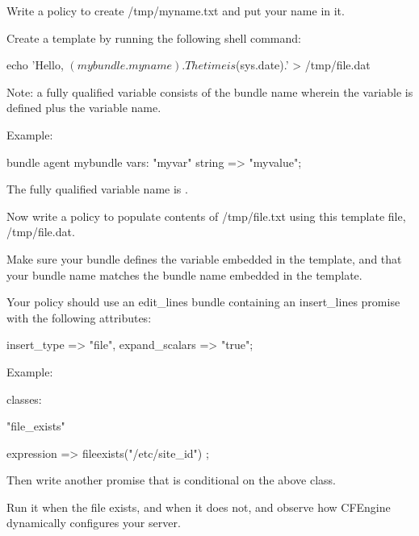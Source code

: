 \begin{aside}
\label{aside:exercise_51}

Write a policy to create /tmp/myname.txt and put your name in it.

\end{aside}





\begin{aside}
\label{aside:exercise_52}

Create a template by running the following shell command:

\begin{code}
echo 'Hello, $(mybundle.myname).  The time is $(sys.date).' > /tmp/file.dat
\end{code}

Note: a fully qualified variable consists of the bundle name wherein the variable is defined plus the variable name.

Example:

\begin{code}
bundle agent mybundle { vars: "myvar" string => "myvalue"; }
\end{code}

The fully qualified variable name is .

Now write a policy to populate contents of /tmp/file.txt using this template file, /tmp/file.dat.

Make sure your bundle defines the variable embedded in the template, and that your bundle name matches the bundle name embedded in the template.

Your policy should use an edit\_lines bundle containing an insert\_lines promise with the following attributes:

\begin{code}
insert_type => "file",
expand_scalars => "true";
\end{code}

\end{aside}





\begin{aside}
\label{aside:exercise_53}

Example:

\begin{code}
    classes:

       "file_exists"

           expression  =>  fileexists("/etc/site_id") ;
\end{code}

Then write another promise that is conditional on the above class.

Run it when the file exists, and when it does not, and observe how CFEngine dynamically configures your server.

\end{aside}





